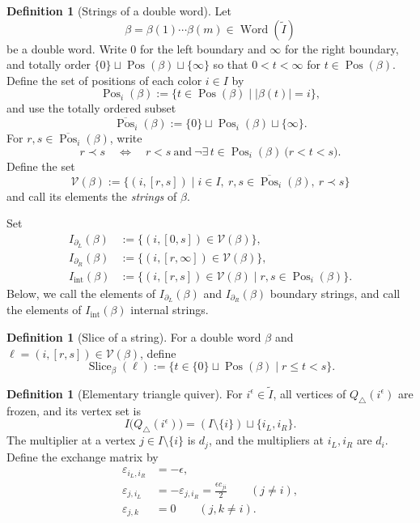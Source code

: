 \documentclass[10pt,a4paper]{article}
\theoremstyle{definition}
\newtheorem{definition}[theorem]{Definition}
\theoremstyle{remark}
\newcommand{\Vcal}{\mathcal V}
\newcommand{\eps}{\varepsilon}
\newcommand{\Word}{\operatorname{Word}}
\begin{document}
\begin{definition}[Strings of a double word]
Let
\[
 \beta=\beta(1)\cdots\beta(m)\in\Word(\widetilde I)
\]
be a double word.  Write \(0\) for the left boundary and \(\infty\)
for the right boundary, and totally order
\(\{0\}\sqcup\operatorname{Pos}(\beta)\sqcup\{\infty\}\) so that
\(0<t<\infty\) for \(t\in\operatorname{Pos}(\beta)\).  Define the set of
positions of each color \(i\in I\) by
\[
 \operatorname{Pos}_i(\beta)
 :=\{t\in\operatorname{Pos}(\beta)\mid |\beta(t)|=i\},
\]
and use the totally ordered subset
\[
 \overline{\operatorname{Pos}}_i(\beta)
 :=
 \{0\}\sqcup\operatorname{Pos}_i(\beta)\sqcup\{\infty\}.
\]
For \(r,s\in\overline{\operatorname{Pos}}_i(\beta)\), write
\[
 r\mathrel{\prec}s
 \quad\Longleftrightarrow\quad
 r<s\ \text{and}\
 \neg\exists\,t\in\operatorname{Pos}_i(\beta)\ \bigl(r<t<s\bigr).
\]
Define the set
\begin{equation}
 \Vcal(\beta)
 :=
 \{(i,[r,s])\mid
   i\in I,\ r,s\in\overline{\operatorname{Pos}}_i(\beta),\
   r\mathrel{\prec}s\}
 \label{eq:string-set}
\end{equation}
and call its elements the \emph{strings} of \(\beta\).

Set
\[
 \begin{aligned}
 I_{\partial_L}(\beta)
 &:=
 \{(i,[0,s])\in\Vcal(\beta)\},\\
 I_{\partial_R}(\beta)
 &:=
 \{(i,[r,\infty])\in\Vcal(\beta)\},\\
 I_{\mathrm{int}}(\beta)
 &:=
 \{(i,[r,s])\in\Vcal(\beta)\mid
  r,s\in\operatorname{Pos}_i(\beta)\}.
 \end{aligned}
\]
Below, we call the elements of \(I_{\partial_L}(\beta)\) and
\(I_{\partial_R}(\beta)\) boundary strings, and call the elements of
\(I_{\mathrm{int}}(\beta)\) internal strings.
\end{definition}

\begin{definition}[Slice of a string]
\label{def:string-slice}
For a double word \(\beta\) and
\(\ell=(i,[r,s])\in\Vcal(\beta)\), define
\[
 \operatorname{Slice}_\beta(\ell)
 :=\{t\in\{0\}\sqcup\operatorname{Pos}(\beta)\mid r\le t<s\}.
\]
\end{definition}

\begin{definition}[Elementary triangle quiver]
\label{def:SW-basic-triangle}
For \(i^\epsilon\in\widetilde I\), all vertices of
\(Q_\triangle(i^\epsilon)\) are frozen, and its vertex set is
\[
 I\bigl(Q_\triangle(i^\epsilon)\bigr)
 =
 (I\setminus\{i\})\sqcup
 \{i_L,i_R\}.
\]
The multiplier at a vertex \(j\in I\setminus\{i\}\) is \(d_j\), and the
multipliers at \(i_L,i_R\) are \(d_i\).  Define the exchange matrix by
\begin{align}
 \eps_{i_L,i_R}
 &=-\epsilon,
 \label{eq:SW-basic-horizontal}\\
 \eps_{j,i_L}
 &=-\eps_{j,i_R}
   =\frac{\epsilon c_{ji}}2
 \qquad(j\ne i),
 \label{eq:SW-basic-slanted}\\
 \eps_{j,k}
 &=0
 \qquad(j,k\ne i).
 \label{eq:SW-basic-other}
\end{align}
\end{definition}
\end{document}

